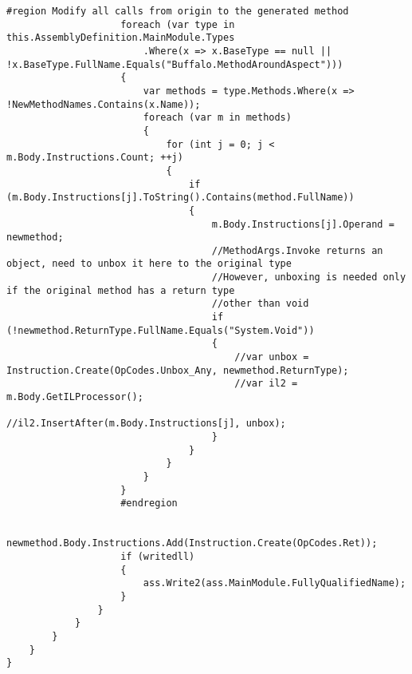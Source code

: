 \begin{lstlisting}[caption={../buffalo/Injectors/MethodAroundInjector.cs}, label=../buffalo/Injectors/MethodAroundInjector.cs, frame=tb, basicstyle=\scriptsize]
                    #region Modify all calls from origin to the generated method
                    foreach (var type in this.AssemblyDefinition.MainModule.Types
                        .Where(x => x.BaseType == null || !x.BaseType.FullName.Equals("Buffalo.MethodAroundAspect")))
                    {
                        var methods = type.Methods.Where(x => !NewMethodNames.Contains(x.Name));
                        foreach (var m in methods)
                        {
                            for (int j = 0; j < m.Body.Instructions.Count; ++j)
                            {
                                if (m.Body.Instructions[j].ToString().Contains(method.FullName))
                                {
                                    m.Body.Instructions[j].Operand = newmethod;
                                    //MethodArgs.Invoke returns an object, need to unbox it here to the original type
                                    //However, unboxing is needed only if the original method has a return type
                                    //other than void
                                    if (!newmethod.ReturnType.FullName.Equals("System.Void"))
                                    {
                                        //var unbox = Instruction.Create(OpCodes.Unbox_Any, newmethod.ReturnType);
                                        //var il2 = m.Body.GetILProcessor();
                                        //il2.InsertAfter(m.Body.Instructions[j], unbox);
                                    }
                                }
                            }
                        }
                    }
                    #endregion

                    newmethod.Body.Instructions.Add(Instruction.Create(OpCodes.Ret));
                    if (writedll)
                    {
                        ass.Write2(ass.MainModule.FullyQualifiedName);
                    }
                }
            }
        }
    }
}
\end{lstlisting}

